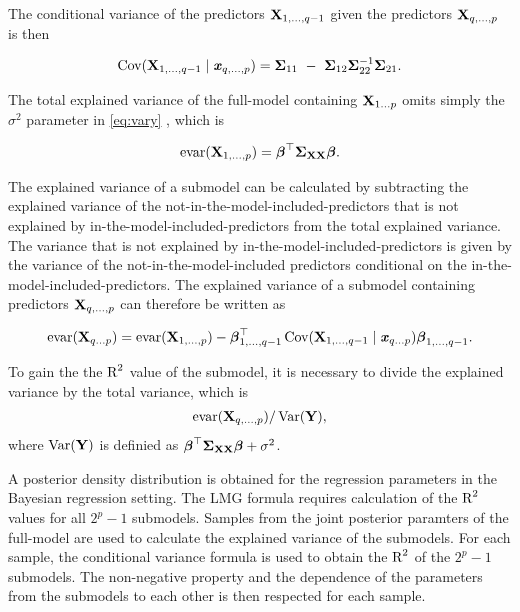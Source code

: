 \documentclass[11pt,a4paper,twoside]{book}
\begin{document}
 The conditional variance of the predictors $ {\mathbf{X}}_{1 ,\dotsc, q-1} $ given the predictors  $ {\mathbf{X}}_{q ,\dotsc, p} $ is then
 
          \begin{align*} 
 \cov(\X_{1,\dotsc, q-1} \mid \x_{q ,\dotsc, p}) = \bSigma_{11}\ -\ \bSigma_{12} \bSigma_{22}^{-1}\bSigma_{21} .
       \end{align*}
       
       The total explained variance of the full-model containing ${\mathbf{X}}_{1 \dots p}$ omits simply the $\sigma^2$ parameter in \eqref{eq:vary} , which is

      \begin{align*} 
        \text{evar}({\mathbf{X}}_{1 ,\dotsc, p}) = {\boldsymbol{\beta}}^\top {\boldsymbol{\Sigma}}{}_{{\mathbf{X}} {\mathbf{X}}}  {\boldsymbol{\beta}}. 
   \end{align*}

The explained variance of a submodel can be calculated by subtracting the explained variance of the not-in-the-model-included-predictors that is not explained by in-the-model-included-predictors from the total explained variance. The variance that is not explained by in-the-model-included-predictors is given by the variance of the not-in-the-model-included predictors conditional on the in-the-model-included-predictors. The explained variance of a submodel containing predictors ${\mathbf{X}}_{q ,\dotsc, p}$ can therefore be written as

       \begin{align} 
       \text{evar}({\mathbf{X}}_{q \dots p}) =  \text{evar}({\mathbf{X}}_{1  ,\dotsc, p}) - {\boldsymbol{\beta}}^\top_{1 ,\dotsc, q-1} \operatorname{Cov}({\mathbf{X}}_{1,\dotsc, {q-1}} \mid {\textbf{\textit{x}}}_{q \dots p}) {\boldsymbol{\beta}}_{1 ,\dotsc, {q-1}} . \label{eq:varsub} 
   \end{align}

To gain the the $\text{R}^2$ value of the submodel, it is necessary to divide the explained variance by the total variance, which is
       \begin{align*} 
\text{evar}({\mathbf{X}}_{q ,\dotsc, p}) / \operatorname{Var}({\mathbf{Y}}),   
\end{align*}
where $\operatorname{Var}({\mathbf{Y}})$ is definied as  ${\boldsymbol{\beta}}^\top {\boldsymbol{\Sigma}}{}_{{\mathbf{X}} {\mathbf{X}}}  {\boldsymbol{\beta}} + \sigma^2$.

A posterior density distribution is obtained for the regression parameters in the Bayesian regression setting. The LMG formula requires calculation of the $\text{R}^2$ values for all $2^p-1$ submodels. Samples from the joint posterior paramters of the full-model are used to calculate the explained variance of the  submodels. For each sample, the  conditional variance formula is used to obtain the $\text{R}^2$ of the $2^p-1$ submodels. The non-negative property and the dependence of the parameters from the submodels to each other is then respected for each sample. 
\end{document}
